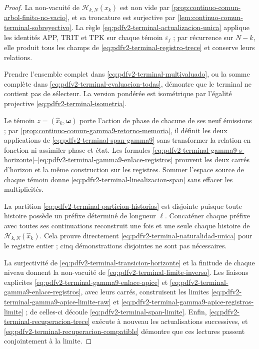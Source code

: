 \begin{proof}
La non-vacuité de \(\mathscr H_{k,N}(\widehat x_k)\) est non vide par \cref{prop:continuo-comun-arbol-finito-no-vacio}, et sa troncature est surjective par \cref{lem:continuo-comun-terminal-sobreyectivo}. La règle \eqref{eq:pdfv2-terminal-actualizacion-unica} applique les identités APP, TRIT et TPK sur chaque témoin \(\varepsilon_j\) ; par récurrence sur \(N-k\), elle produit tous les champs de \eqref{eq:pdfv2-terminal-registro-trece} et conserve leurs relations.

Prendre l'ensemble complet dans \eqref{eq:pdfv2-terminal-multivaluado}, ou la somme complète dans \eqref{eq:pdfv2-terminal-evaluacion-todas}, démontre que le terminal ne contient pas de sélecteur. La version pondérée est isométrique par l'égalité projective \eqref{eq:pdfv2-terminal-isometria}.

Le témoin \(z=(\widehat x_k,\boldsymbol\omega)\) porte l'action de phase de chacune de ses neuf émissions ; par \cref{prop:continuo-comun-gamma9-retorno-memoria}, il définit les deux applications de \eqref{eq:pdfv2-terminal-span-gamma9} sans transformer la relation en fonction ni assimiler phase et état. Les formules \eqref{eq:pdfv2-terminal-gamma9-s-horizonte}--\eqref{eq:pdfv2-terminal-gamma9-enlace-registros} prouvent les deux carrés d'horizon et la même construction sur les registres. Sommer l'espace source de chaque témoin donne \eqref{eq:pdfv2-terminal-linealizacion-span} sans effacer les multiplicités.

La partition \eqref{eq:pdfv2-terminal-particion-historias} est disjointe puisque toute histoire possède un préfixe déterminé de longueur \(\ell\). Concaténer chaque préfixe avec toutes ses continuations reconstruit une fois et une seule chaque histoire de \(\mathscr H_{k,N}(\widehat x_k)\). Cela prouve directement \eqref{eq:pdfv2-terminal-naturalidad-unica} pour le registre entier ; cinq démonstrations disjointes ne sont pas nécessaires.

La surjectivité de \eqref{eq:pdfv2-terminal-transicion-horizonte} et la finitude de chaque niveau donnent la non-vacuité de \eqref{eq:pdfv2-terminal-limite-inverso}. Les liaisons explicites \eqref{eq:pdfv2-terminal-gamma9-enlace-apice} et \eqref{eq:pdfv2-terminal-gamma9-enlace-registros}, avec leurs carrés, construisent les limites \eqref{eq:pdfv2-terminal-gamma9-apice-limite-raw} et \eqref{eq:pdfv2-terminal-gamma9-apice-registros-limite} ; de celles-ci découle \eqref{eq:pdfv2-terminal-span-limite}. Enfin, \eqref{eq:pdfv2-terminal-recuperacion-trece} exécute à nouveau les actualisations successives, et \eqref{eq:pdfv2-terminal-recuperacion-compatible} démontre que ces lectures passent conjointement à la limite.
\end{proof}

